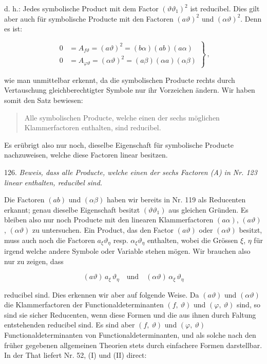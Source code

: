 \documentclass[11pt]{article}
\providecommand{\gesperrt}[1]{\textls[130]{#1}}
\providecommand{\weberpage}[1]{}
\providecommand{\weq}[2]{\begin{equation}\tag{#1}#2\end{equation}}
\begin{document}
d. h.: \glqq Jedes symbolische Product mit dem Factor $(\vartheta\vartheta_1)^2$ ist
reducibel.\grqq{}
Dies gilt aber auch für symbolische Producte mit den Factoren
$(a\vartheta)^2$ und $(\alpha\vartheta)^2$. Denn es ist:

\weq{7}{
\left.
\begin{aligned}
0 &= A_{f\vartheta} = (a\vartheta)^2 = (b\alpha)(ab)(a\alpha) \\
0 &= A_{\varphi\vartheta} = (\alpha\vartheta)^2 = (a\beta)(\alpha a)(\alpha\beta)
\end{aligned}
\right\}\,,
}

wie man unmittelbar erkennt, da die symbolischen Producte rechts
durch Vertauschung gleichberechtigter Symbole nur ihr Vorzeichen
ändern. Wir haben somit den Satz bewiesen:

\begin{quote}
\glqq Alle symbolischen Producte, welche einen der sechs möglichen
Klammerfactoren \gesperrt{quadratisch} enthalten, sind reducibel.\grqq{}
\end{quote}

Es erübrigt also nur noch, dieselbe Eigenschaft für symbolische
Producte nachzuweisen, welche diese Factoren linear besitzen.

126. \textit{Beweis, dass alle Producte, welche einen der sechs Factoren (A)
in Nr. 123 linear enthalten, reducibel sind.}


\weberpage{142}

Die Factoren $(ab)$ und $(\alpha\beta)$ haben wir bereits in Nr. 119 als Reducenten
erkannt; genau dieselbe Eigenschaft besitzt $(\vartheta\vartheta_1)$ aus gleichen Gründen.
Es bleiben also nur noch Producte mit den linearen Klammerfactoren
$(a\alpha)$, $(a\vartheta)$, $(\alpha\vartheta)$ zu untersuchen. Ein Product, das den Factor $(a\vartheta)$
oder $(\alpha\vartheta)$ besitzt, muss auch noch die Factoren $a_\xi\vartheta_\eta$ resp.
$\alpha_\xi\vartheta_\eta$ enthalten, wobei die Grössen $\xi$, $\eta$ für irgend welche andere
Symbole oder Variable stehen mögen. Wir brauchen also nur zu zeigen, dass

\[
(a\vartheta)\,a_\xi\,\vartheta_\eta \quad \text{und} \quad (\alpha\vartheta)\,\alpha_\xi\,\vartheta_\eta
\]

reducibel sind. Dies erkennen wir aber auf folgende Weise. Da $(a\vartheta)$
und $(\alpha\vartheta)$ die Klammerfactoren der Functionaldeterminanten $(f,\ \vartheta)$
und $(\varphi,\ \vartheta)$ sind, so sind sie sicher Reducenten, wenn diese Formen
und die aus ihnen durch Faltung entstehenden reducibel sind. Es
sind aber $(f,\ \vartheta)$ und $(\varphi,\ \vartheta)$ Functionaldeterminanten von Functionaldeterminanten, und als solche nach den früher gegebenen allgemeinen
Theorien stets durch einfachere Formen darstellbar. In der That
liefert Nr. 52, (I) und (II) direct:
\end{document}
